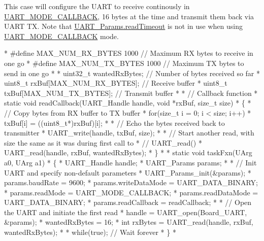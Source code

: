 This case will configure the U\-A\-R\-T to receive continously in \hyperlink{_u_a_r_t_8h_a2507a620dba95cd20885c52494d19e90ae0dbd9b5195e56c3c2aed10163523754}{U\-A\-R\-T\-\_\-\-M\-O\-D\-E\-\_\-\-C\-A\-L\-L\-B\-A\-C\-K}, 16 bytes at the time and transmit them back via U\-A\-R\-T T\-X. Note that \hyperlink{struct_u_a_r_t___params_a10875d91873fb77106bde0b799f961e2}{U\-A\-R\-T\-\_\-\-Params.\-read\-Timeout} is not in use when using \hyperlink{_u_a_r_t_8h_a2507a620dba95cd20885c52494d19e90ae0dbd9b5195e56c3c2aed10163523754}{U\-A\-R\-T\-\_\-\-M\-O\-D\-E\-\_\-\-C\-A\-L\-L\-B\-A\-C\-K} mode. 
\begin{DoxyCode}
*  #define MAX\_NUM\_RX\_BYTES    1000   \textcolor{comment}{// Maximum RX bytes to receive in one go}
*  #define MAX\_NUM\_TX\_BYTES    1000   \textcolor{comment}{// Maximum TX bytes to send in one go}
*
*  uint32\_t wantedRxBytes;            \textcolor{comment}{// Number of bytes received so far}
*  uint8\_t rxBuf[MAX\_NUM\_RX\_BYTES];   \textcolor{comment}{// Receive buffer}
*  uint8\_t txBuf[MAX\_NUM\_TX\_BYTES];   \textcolor{comment}{// Transmit buffer}
*
*  \textcolor{comment}{// Callback function}
*  \textcolor{keyword}{static} \textcolor{keywordtype}{void} readCallback(UART_Handle handle, \textcolor{keywordtype}{void} *rxBuf, \textcolor{keywordtype}{size\_t} size)
*  \{
*      \textcolor{comment}{// Copy bytes from RX buffer to TX buffer}
*      \textcolor{keywordflow}{for}(\textcolor{keywordtype}{size\_t} i = 0; i < size; i++)
*          txBuf[i] = ((uint8\_t*)rxBuf)[i];
*
*      \textcolor{comment}{// Echo the bytes received back to transmitter}
*      UART_write(handle, txBuf, size);
*
*      \textcolor{comment}{// Start another read, with size the same as it was during first call to}
*      \textcolor{comment}{// UART\_read()}
*      UART_read(handle, rxBuf, wantedRxBytes);
*  \}
*
*  \textcolor{keyword}{static} \textcolor{keywordtype}{void} taskFxn(UArg a0, UArg a1)
*  \{
*      UART_Handle handle;
*      UART_Params params;
*
*      \textcolor{comment}{// Init UART and specify non-default parameters}
*      UART_Params_init(&params);
*      params.baudRate      = 9600;
*      params.writeDataMode = UART_DATA_BINARY;
*      params.readMode      = UART_MODE_CALLBACK;
*      params.readDataMode  = UART_DATA_BINARY;
*      params.readCallback  = readCallback;
*
*      \textcolor{comment}{// Open the UART and initiate the first read}
*      handle = UART_open(Board\_UART, &params);
*      wantedRxBytes = 16;
*      \textcolor{keywordtype}{int} rxBytes = UART_read(handle, rxBuf, wantedRxBytes);
*
*      \textcolor{keywordflow}{while}(\textcolor{keyword}{true}); \textcolor{comment}{// Wait forever}
*  \}
*  
\end{DoxyCode}


